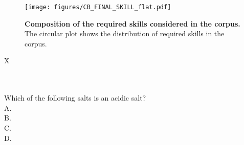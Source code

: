 \begin{figure}
    \centering
    \texttt{[image: figures/CB\_FINAL\_SKILL\_flat.pdf]}
    \caption{\textbf{Composition of the required skills considered in the \chembench corpus.} The circular plot shows the distribution of required skills in the \chembench corpus.}
    \label{fig:cb_skillset}
\end{figure}


\begin{xltabular}{\textwidth}{X}
    \caption{\textbf{Examples for each required skill considered in the \chembench corpus.} The table shows the number of questions for each skill and an example question. Note that the total count in this table is bigger than the \chembench corpus. This is because the same question can be annotated with two different skills, e.g., Reasoning and Calculation.}    
    \label{tab:chembench_corpus_cognitive} \\
            \toprule
             \\
            \midrule
            Which of the following salts is an acidic salt? \\
            A.  \\
            B.  \\
            C.  \\
            D.  \\
            \midrule
             \\
            \midrule

\end{xltabular}
